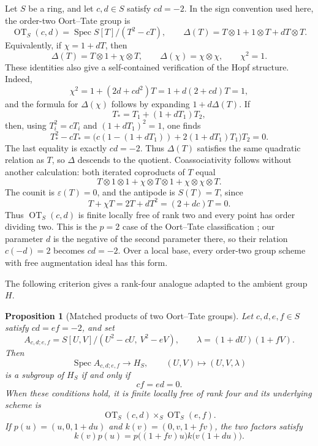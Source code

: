 \documentclass[11pt]{amsart}
\newtheorem{proposition}[theorem]{Proposition}
\theoremstyle{remark}
\newcommand{\Spec}{\operatorname{Spec}}
\newcommand{\eps}{\varepsilon}
\newcommand{\ot}{\otimes}
\begin{document}
Let \(S\) be a ring, and let \(c,d\in S\) satisfy \(cd=-2\).  In the
sign convention used here, the order-two Oort--Tate group is
\begin{equation}\label{eq:OT2}
 \operatorname{OT}_S(c,d)
 =
 \Spec S[T]/(T^2-cT),
 \qquad
 \Delta(T)
 =T\ot1+1\ot T+dT\ot T.
\end{equation}
Equivalently, if \(\chi=1+dT\), then
\[
 \Delta(T)=T\ot1+\chi\ot T,
 \qquad
 \Delta(\chi)=\chi\ot\chi,
 \qquad
 \chi^2=1.
\]
These identities also give a self-contained verification of the Hopf
structure.  Indeed,
\[
 \chi^2
 =1+(2d+cd^2)T
 =1+d(2+cd)T
 =1,
\]
and the formula for \(\Delta(\chi)\) follows by expanding
\(1+d\Delta(T)\).  If
\[
 T_*=T_1+(1+dT_1)T_2,
\]
then, using \(T_i^2=cT_i\) and \((1+dT_1)^2=1\), one finds
\[
 T_*^2-cT_*
 =
 \bigl(c(1-(1+dT_1))+2(1+dT_1)T_1\bigr)T_2
 =0.
\]
The last equality is exactly \(cd=-2\).
Thus \(\Delta(T)\) satisfies the same quadratic relation as \(T\), so
\(\Delta\) descends to the quotient.  Coassociativity follows without
another calculation: both iterated coproducts of \(T\) equal
\[
 T\ot1\ot1+\chi\ot T\ot1+\chi\ot\chi\ot T.
\]
The counit is \(\eps(T)=0\), and the antipode is
\(S(T)=T\), since
\[
 T+\chi T=2T+dT^2=(2+dc)T=0.
\]
Thus \(\operatorname{OT}_S(c,d)\) is finite locally free of rank two
and every point has order dividing two.
This is the \(p=2\) case of the Oort--Tate classification
\cite[Introduction]{OortTate}; our parameter \(d\) is the negative of
the second parameter there, so their relation \(c(-d)=2\) becomes
\(cd=-2\).  Over a local base, every order-two group scheme with free
augmentation ideal has this form.

The following criterion gives a rank-four analogue adapted to the
ambient group \(H\).

\begin{proposition}[Matched products of two Oort--Tate groups]
\label{prop:OT-matched}
Let \(c,d,e,f\in S\) satisfy \(cd=ef=-2\), and set
\[
 A_{c,d;e,f}
 =
 S[U,V]/(U^2-cU,\ V^2-eV),
 \qquad
 \lambda=(1+dU)(1+fV).
\]
Then
\begin{equation}\label{eq:OT-matched-graph}
 \Spec A_{c,d;e,f}\longrightarrow H_S,
 \qquad
 (U,V)\longmapsto(U,V,\lambda)
\end{equation}
is a subgroup of \(H_S\) if and only if
\begin{equation}\label{eq:OT-matched-conditions}
 cf=ed=0.
\end{equation}
When these conditions hold, it is finite locally free of rank four and
its underlying
scheme is
\[
 \operatorname{OT}_S(c,d)
 \times_S
 \operatorname{OT}_S(e,f).
\]
If \(p(u)=(u,0,1+du)\) and \(k(v)=(0,v,1+fv)\), the two factors satisfy
\begin{equation}\label{eq:OT-refactor}
 k(v)p(u)
 =
 p\bigl((1+fv)u\bigr)
 k\bigl(v(1+du)\bigr).
\end{equation}
\end{proposition}
\end{document}
